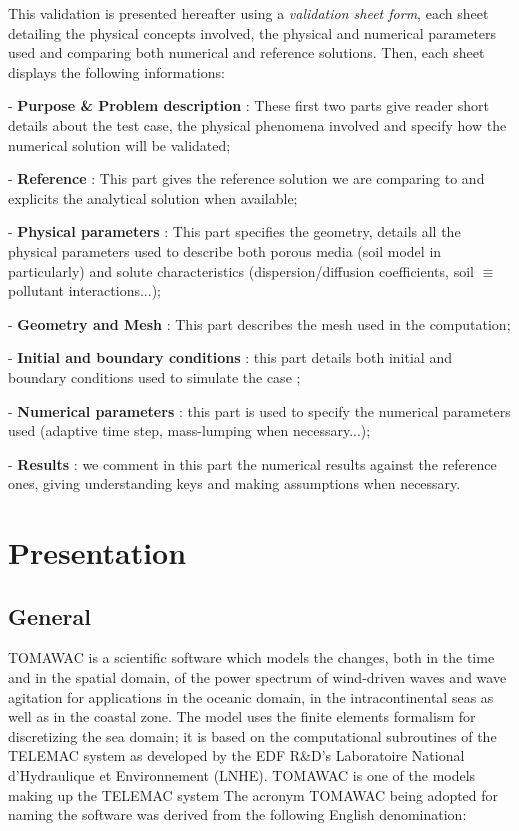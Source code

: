This validation is presented hereafter using a \textit{validation sheet form},
each sheet detailing the physical concepts involved, the physical and numerical parameters used and comparing both numerical and reference solutions.
Then, each sheet displays the following informations:
\begin{list}{-}{}
\item [-] \textbf{Purpose \& Problem description} : These first two parts give reader short details about the test case, the physical phenomena involved and specify how the numerical solution will be validated;
\item [-] \textbf{Reference} : This part gives the reference solution we are comparing to and explicits the analytical solution when available;
\item [-] \textbf{Physical parameters} : This part specifies the geometry,
details all the physical parameters used to describe both porous media (soil model in particularly) and
solute characteristics (dispersion/diffusion coefficients, soil $\equiv$ pollutant interactions...);
\item [-] \textbf{Geometry and Mesh} : This part describes the mesh used in the \tomawac computation;
\item [-] \textbf{Initial and boundary conditions} : this part details both initial and boundary conditions used to simulate the case ;
\item [-] \textbf{Numerical parameters} : this part is used to specify the numerical parameters used
(adaptive time step, mass-lumping when necessary...);
\item [-] \textbf{Results} : we comment in this part the numerical results against the reference ones,
giving understanding keys and making assumptions when necessary.
\end{list}
%
\bigskip
%
\clearpage
\section{Presentation}
\subsection{General}
TOMAWAC is a scientific software which models the changes, both in the time and in the spatial domain, of the power spectrum of wind-driven waves and wave agitation for applications in the oceanic domain, in the intracontinental seas as well as in the coastal zone. The model uses the finite elements formalism for discretizing the sea domain; it is based on the computational subroutines of the TELEMAC system as developed by the EDF R\&D’s Laboratoire National d'Hydraulique et Environnement (LNHE). TOMAWAC is one of the models making up the TELEMAC system 
The acronym TOMAWAC being adopted for naming the software was derived from the following English denomination:

